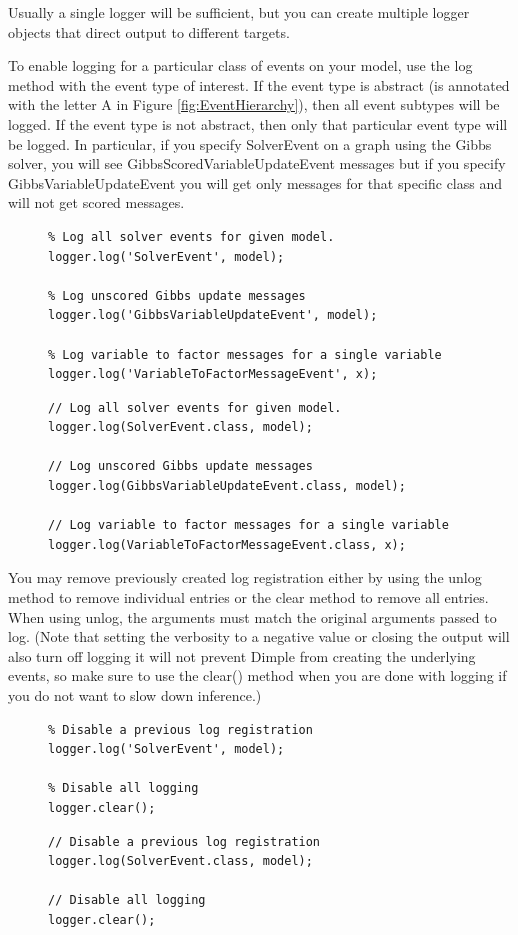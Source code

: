 Usually a single logger will be sufficient, but you can create multiple logger objects that direct output to different targets.

To enable logging for a particular class of events on your model, use the log method with the event type of interest. If the event type is abstract (is annotated with the letter A in Figure \ref{fig:EventHierarchy}), then
all event subtypes will be logged. If the event type is not abstract, then
only that particular event type will be logged. In particular, if you specify SolverEvent on a graph using the Gibbs solver, you will see
GibbsScoredVariableUpdateEvent messages but if you specify
GibbsVariableUpdateEvent you will get only messages for that specific
class and will not get scored messages.

\begin{figure}[H]
\ifmatlab
\begin{lstlisting}
% Log all solver events for given model.
logger.log('SolverEvent', model);

% Log unscored Gibbs update messages
logger.log('GibbsVariableUpdateEvent', model);

% Log variable to factor messages for a single variable
logger.log('VariableToFactorMessageEvent', x);
\end{lstlisting}
\fi

\ifjava
\begin{lstlisting}
// Log all solver events for given model.
logger.log(SolverEvent.class, model);

// Log unscored Gibbs update messages
logger.log(GibbsVariableUpdateEvent.class, model);

// Log variable to factor messages for a single variable
logger.log(VariableToFactorMessageEvent.class, x);
\end{lstlisting}
\fi
\end{figure}

You may remove previously created log registration either by
using the unlog method to remove individual entries or the clear
method to remove all entries. When using unlog, the arguments must
match the original arguments passed to log. (Note that setting the verbosity to a negative value or closing the output will also turn off logging it will not prevent Dimple from creating the underlying events, so make sure to use the clear() method when you are done with logging if you do not want to slow down inference.)

\begin{figure}[H]
\ifmatlab
\begin{lstlisting}
% Disable a previous log registration
logger.log('SolverEvent', model);

% Disable all logging
logger.clear();
\end{lstlisting}
\fi

\ifjava
\begin{lstlisting}
// Disable a previous log registration
logger.log(SolverEvent.class, model);

// Disable all logging
logger.clear();
\end{lstlisting}
\fi
\end{figure}

